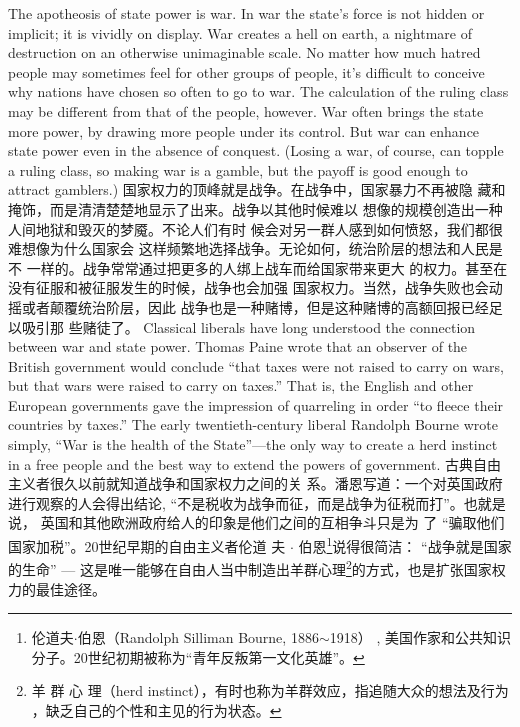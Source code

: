 \begin{paracol}{2}
The apotheosis of state power is war. In war the state's force is
not hidden or implicit; it is vividly on display. War creates a hell
on earth, a nightmare of destruction on an otherwise unimaginable scale. No matter how much hatred people may sometimes
feel for other groups of people, it's difficult to conceive why nations have chosen so often to go to war. The calculation of the
ruling class may be different from that of the people, however.
War often brings the state more power, by drawing more people under its control. But war can enhance state power even in
the absence of conquest. (Losing a war, of course, can topple a
ruling class, so making war is a gamble, but the payoff is good
enough to attract gamblers.)
\switchcolumn
国家权力的顶峰就是战争。在战争中，国家暴力不再被隐
藏和掩饰，而是清清楚楚地显示了出来。战争以其他时候难以
想像的规模创造出一种人间地狱和毁灭的梦魇。不论人们有时
候会对另一群人感到如何愤怒，我们都很难想像为什么国家会
这样频繁地选择战争。无论如何，统治阶层的想法和人民是不
一样的。战争常常通过把更多的人绑上战车而给国家带来更大
的权力。甚至在没有征服和被征服发生的时候，战争也会加强
国家权力。当然，战争失败也会动摇或者颠覆统治阶层，因此
战争也是一种赌博，但是这种赌博的高额回报已经足以吸引那
些赌徒了。
\switchcolumn*
Classical liberals have long understood the connection between war and state power. Thomas Paine wrote that an observer of the British government would conclude ``that taxes
were not raised to carry on wars, but that wars were raised to
carry on taxes.'' That is, the English and other European governments gave the impression of quarreling in order ``to fleece
their countries by taxes.'' The early twentieth-century liberal
Randolph Bourne wrote simply, ``War is the health of the
State''---the only way to create a herd instinct in a free people
and the best way to extend the powers of government.
\switchcolumn
古典自由主义者很久以前就知道战争和国家权力之间的关
系。潘恩写道：一个对英国政府进行观察的人会得出结论,
“不是税收为战争而征，而是战争为征税而打”。也就是说，
英国和其他欧洲政府给人的印象是他们之间的互相争斗只是为
了 “骗取他们国家加税”。20世纪早期的自由主义者伦道
夫 $\cdot$ 伯恩\footnote{伦道夫$\cdot$伯恩（Randolph  Silliman Bourne, 1886$\sim$1918） , 美国作家和公共知识分子。20世纪初期被称为“青年反叛第一文化英雄”。}说得很简洁： “战争就是国家的生命” --- 这是唯一能够在自由人当中制造出羊群心理\footnote{羊 群 心 理（herd instinct），有时也称为羊群效应，指追随大众的想法及行为 ，缺乏自己的个性和主见的行为状态。}的方式，也是扩张国家权力的最佳途径。

\end{paracol}
